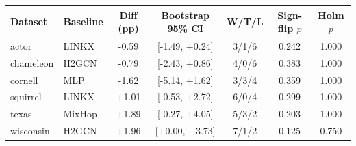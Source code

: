 \begin{tabular*}{0.94\linewidth}{@{\extracolsep{\fill}}llccccc@{}}
\toprule
Dataset & Baseline & Diff (pp) & Bootstrap 95\% CI & W/T/L & Sign-flip $p$ & Holm $p$ \\
\midrule
actor & LINKX & -0.59 & [-1.49, +0.24] & 3/1/6 & 0.242 & 1.000 \\
chameleon & H2GCN & -0.79 & [-2.43, +0.86] & 4/0/6 & 0.383 & 1.000 \\
cornell & MLP & -1.62 & [-5.14, +1.62] & 3/3/4 & 0.359 & 1.000 \\
squirrel & LINKX & +1.01 & [-0.53, +2.72] & 6/0/4 & 0.299 & 1.000 \\
texas & MixHop & +1.89 & [-0.27, +4.05] & 5/3/2 & 0.203 & 1.000 \\
wisconsin & H2GCN & +1.96 & [+0.00, +3.73] & 7/1/2 & 0.125 & 0.750 \\
\bottomrule
\end{tabular*}
